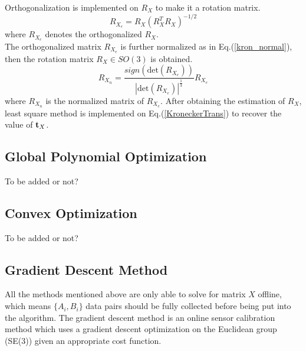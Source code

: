 \documentclass[twocolumn,10pt]{asme2ej}
\newcommand{\ttt}{{\bf t}}
\begin{document}
{\color{blue}
Orthogonalization is implemented on $R_{X}$ to make it a rotation matrix. \\
\begin{equation}
R_{X_{e}} = R_{X}(R_{X}^{T}R_{X})^{-1/2}
\label{Orthogonolization}
\end{equation}
\cite{horn1986robot}
where $R_{X_{e}}$ denotes the orthogonalized $R_{X}$.\\
The orthogonalized matrix $R_{X_{e}}$ is further normalized as in Eq.(\ref{kron_normal}), then the rotation matrix $R_{X} \in SO(3)$ is obtained. 
\begin{equation}
R_{X_{n}} = \dfrac{sign(\textrm{det}(R_{X_{e}}))}{{|\textrm{det}(R_{X_{e}})|}^{\tfrac{1}{3}}}R_{X_{e}}
\label{kron_normal}
\end{equation}
where $R_{X_{n}}$ is the normalized matrix of $R_{X_{e}}$.
After obtaining the estimation of $R_{X}$, least square method is implemented on Eq.(\ref{KroneckerTrans}) to recover the value of $\ttt_{X}$.  
}
\subsection{Global Polynomial Optimization}
{\color{red}To be added or not?}

\subsection{Convex Optimization}
{\color{red}To be added or not?}

\subsection{Gradient Descent Method}
All the methods mentioned above are only able to solve for matrix $X$ offline, which means $\{A_{i}, B_{i}\}$ data pairs should be fully collected before being put into the algorithm. The gradient descent method \cite{ackerman2014online} is an online sensor calibration method which uses a gradient descent optimization on the Euclidean group (SE(3)) given an appropriate cost function. 
\end{document}
